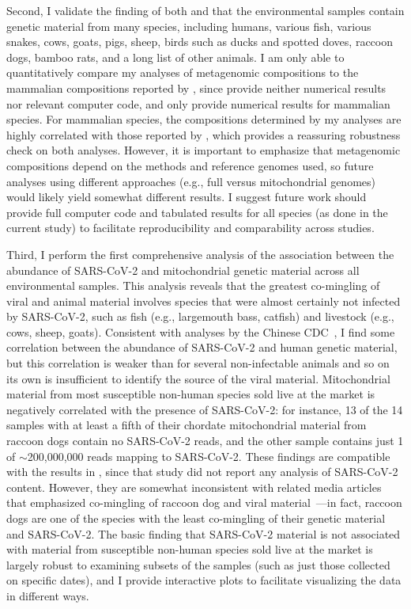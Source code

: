 \documentclass[9pt,twocolumn,twoside]{gsajnl_modified}
\begin{document}
Second, I validate the finding of both \citet{crits2023genetic} and \citet{liu2023surveillance} that the environmental samples contain genetic material from many species, including humans, various fish, various snakes, cows, goats, pigs, sheep, birds such as ducks and spotted doves, raccoon dogs, bamboo rats, and a long list of other animals.
I am only able to quantitatively compare my analyses of metagenomic compositions to the mammalian compositions reported by \citet{crits2023genetic}, since \citet{liu2023surveillance} provide neither numerical results nor relevant computer code, and \citet{crits2023genetic} only provide numerical results for mammalian species.
For mammalian species, the compositions determined by my analyses are highly correlated with those reported by \citet{crits2023genetic}, which provides a reassuring robustness check on both analyses.
However, it is important to emphasize that metagenomic compositions depend on the methods and reference genomes used, so future analyses using different approaches (e.g., full versus mitochondrial genomes) would likely yield somewhat different results.
I suggest future work should provide full computer code and tabulated results for all species (as done in the current study) to facilitate reproducibility and comparability across studies.

Third, I perform the first comprehensive analysis of the association between the abundance of SARS-CoV-2 and mitochondrial genetic material across all environmental samples.
This analysis reveals that the greatest co-mingling of viral and animal material involves species that were almost certainly not infected by SARS-CoV-2, such as fish (e.g., largemouth bass, catfish) and livestock (e.g., cows, sheep, goats).
Consistent with analyses by the Chinese CDC~\citep{liu2022surveillance}, I find some correlation between the abundance of SARS-CoV-2 and human genetic material, but this correlation is weaker than for several non-infectable animals and so on its own is insufficient to identify the source of the viral material.
Mitochondrial material from most susceptible non-human species sold live at the market is negatively correlated with the presence of SARS-CoV-2: for instance, 13 of the 14 samples with at least a fifth of their chordate mitochondrial material from raccoon dogs contain no SARS-CoV-2 reads, and the other sample contains just 1 of $\sim$200,000,000 reads mapping to SARS-CoV-2.
These findings are compatible with the results in \citet{crits2023genetic}, since that study did not report any analysis of SARS-CoV-2 content.
However, they are somewhat inconsistent with related media articles that emphasized co-mingling of raccoon dog and viral material~\citep{wu2023atlantic,mueller2023nytimes}---in fact, raccoon dogs are one of the species with the least co-mingling of their genetic material and SARS-CoV-2.
The basic finding that SARS-CoV-2 material is not associated with material from susceptible non-human species sold live at the market is largely robust to examining subsets of the samples (such as just those collected on specific dates), and I provide interactive plots to facilitate visualizing the data in different ways.
\end{document}

